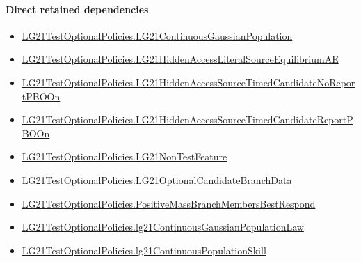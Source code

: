 \documentclass[10pt]{article}
\begin{document}
\paragraph{Direct retained dependencies}
\begin{itemize}\raggedright
\item \hyperlink{paper-prerequisite-f5e1c886d250142b}{LG21\allowbreak{}Test\allowbreak{}Optional\allowbreak{}Policies.\allowbreak{}LG21\allowbreak{}Continuous\allowbreak{}Gaussian\allowbreak{}Population}
\item \hyperlink{governing-declaration-f111cafc341ec52d}{LG21\allowbreak{}Test\allowbreak{}Optional\allowbreak{}Policies.\allowbreak{}LG21\allowbreak{}Hidden\allowbreak{}Access\allowbreak{}Literal\allowbreak{}Source\allowbreak{}Equilibrium\allowbreak{}AE}
\item \hyperlink{governing-declaration-d5b46e2bf57ef613}{LG21\allowbreak{}Test\allowbreak{}Optional\allowbreak{}Policies.\allowbreak{}LG21\allowbreak{}Hidden\allowbreak{}Access\allowbreak{}Source\allowbreak{}Timed\allowbreak{}Candidate\allowbreak{}No\allowbreak{}Report\allowbreak{}PBO\allowbreak{}On}
\item \hyperlink{governing-declaration-dc273b7fe4c2d289}{LG21\allowbreak{}Test\allowbreak{}Optional\allowbreak{}Policies.\allowbreak{}LG21\allowbreak{}Hidden\allowbreak{}Access\allowbreak{}Source\allowbreak{}Timed\allowbreak{}Candidate\allowbreak{}Report\allowbreak{}PBO\allowbreak{}On}
\item \hyperlink{governing-declaration-81cb73bf3869c56d}{LG21\allowbreak{}Test\allowbreak{}Optional\allowbreak{}Policies.\allowbreak{}LG21\allowbreak{}Non\allowbreak{}Test\allowbreak{}Feature}
\item \hyperlink{governing-declaration-5ca7587508e20c80}{LG21\allowbreak{}Test\allowbreak{}Optional\allowbreak{}Policies.\allowbreak{}LG21\allowbreak{}Optional\allowbreak{}Candidate\allowbreak{}Branch\allowbreak{}Data}
\item \hyperlink{governing-declaration-c88a4672ccb48271}{LG21\allowbreak{}Test\allowbreak{}Optional\allowbreak{}Policies.\allowbreak{}Positive\allowbreak{}Mass\allowbreak{}Branch\allowbreak{}Members\allowbreak{}Best\allowbreak{}Respond}
\item \hyperlink{governing-declaration-8fd8cc4e09eeb58a}{LG21\allowbreak{}Test\allowbreak{}Optional\allowbreak{}Policies.\allowbreak{}lg21\allowbreak{}Continuous\allowbreak{}Gaussian\allowbreak{}Population\allowbreak{}Law}
\item \hyperlink{governing-declaration-339ce55dcb78dfb9}{LG21\allowbreak{}Test\allowbreak{}Optional\allowbreak{}Policies.\allowbreak{}lg21\allowbreak{}Continuous\allowbreak{}Population\allowbreak{}Skill}

\end{itemize}
\end{document}
